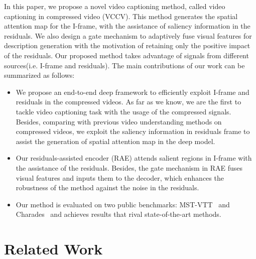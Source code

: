 \documentclass[a4paper,conference]{IEEEtran}
\begin{document}
In this paper, we propose a novel video captioning method, called video captioning in compressed video (VCCV). This method generates the spatial attention map for the I-frame, with the assistance of saliency information in the residuals. We also design a gate mechanism to adaptively fuse visual features for description generation with the motivation of retaining only the positive impact of the residuals. Our proposed method takes advantage of signals from different sources(i.e. I-frame and residuals). The main contributions of our work can be summarized as follows: 

\begin{itemize}
\item We propose an end-to-end deep framework to efficiently exploit I-frame and residuals in the compressed videos. As far as we know, we are the first to tackle video captioning task with the usage of the compressed signals. Besides, comparing with previous video understanding methods on compressed videos, we exploit the saliency information in residuals frame to assist the generation of spatial attention map in the deep model.

\end{itemize}

\begin{itemize}
\item  Our residuals-assisted encoder (RAE) attends salient regions in I-frame with the assistance of the residuals. Besides, the gate mechanism in RAE fuses visual features and inputs them to the decoder, which enhances the robustness of the method against the noise in the residuals. 
\end{itemize}
 
\begin{itemize}
\item Our method is evaluated on two public benchmarks: MST-VTT~\cite{xu2016msr} and Charades~\cite{sigurdsson2016hollywood} and achieves results that rival state-of-the-art methods.
\end{itemize}


\section{Related Work}
\end{document}
